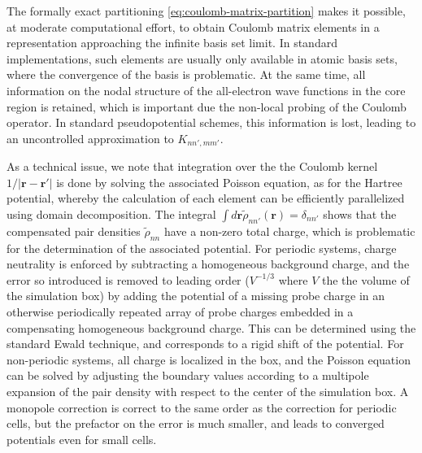 \documentclass[a4paper]{article}
\newcommand{\br}{\mathbf{r}}
\newcommand{\rr}{|\mathbf{r} - \mathbf{r}'|}
\begin{document}
The formally exact partitioning \ref{eq:coulomb-matrix-partition}
makes it possible, at moderate computational effort, to obtain Coulomb
matrix elements in a representation approaching the infinite basis set
limit. In standard implementations, such elements are usually only
available in atomic basis sets, where the convergence of the basis is
problematic. At the same time, all information on the nodal structure
of the all-electron wave functions in the core region is retained,
which is important due the non-local probing of the Coulomb operator.
In standard pseudopotential schemes, this information is lost, leading
to an uncontrolled approximation to $K_{nn',mm'}$.

As a technical issue, we note that integration over the the Coulomb
kernel $1/\rr$ is done by solving the associated Poisson equation, as
for the Hartree potential, whereby the calculation of each element can
be efficiently parallelized using domain decomposition. The integral
$\int d\br\tilde{\rho}_{nn'}(\br) = \delta_{nn'}$ shows that the
compensated pair densities $\tilde{\rho}_{nn}$ have a non-zero total
charge, which is problematic for the determination of the associated
potential. For periodic systems, charge neutrality is enforced by
subtracting a homogeneous background charge, and the error so
introduced is removed to leading order ($V^{-1/3}$ where $V$ the the
volume of the simulation box) by adding the potential of a missing
probe charge in an otherwise periodically repeated array of probe
charges embedded in a compensating homogeneous background charge. This
can be determined using the standard Ewald technique, and corresponds
to a rigid shift of the potential. For non-periodic systems, all
charge is localized in the box, and the Poisson equation can be solved
by adjusting the boundary values according to a multipole expansion of
the pair density with respect to the center of the simulation box. A
monopole correction is correct to the same order as the correction for
periodic cells, but the prefactor on the error is much smaller, and
leads to converged potentials even for small cells.
\end{document}
